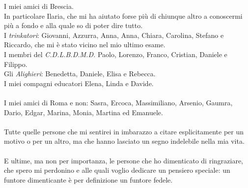 \documentclass[openany]{book}
\begin{document}
I miei amici di Brescia.\\
In particolare Ilaria, che mi ha aiutato forse più di chiunque altro a conoscermi più a fondo e alla quale so di poter dire tutto.\\
I \textit{trinkatori}: Giovanni, Azzurra, Anna, Anna, Chiara, Carolina, Stefano e Riccardo, che mi è stato vicino nel mio ultimo esame.\\
I membri del \textit{C.D.L.B.D.M.D.} Paolo, Lorenzo, Franco, Cristian, Daniele e Filippo.\\
Gli \textit{Alighieri}: Benedetta, Daniele, Elisa e Rebecca.\\
I miei compagni educatori Elena, Linda e Davide.\\
\\
I miei amici di Roma e non: Sasra, Ercoca, Massimiliano, Arsenio, Gaumra, Dario, Edgar, Marina, Monia, Martina ed Emanuele.\\
\\
Tutte quelle persone che mi sentirei in imbarazzo a citare esplicitamente per un motivo o per un altro, ma che hanno lasciato un segno indelebile nella mia vita.\\
\\
E ultime, ma non per importanza, le persone che ho dimenticato di ringraziare, che spero mi perdonino e alle quali voglio dedicare un pensiero speciale: un funtore dimenticante è per definizione un funtore fedele.
\end{document}
